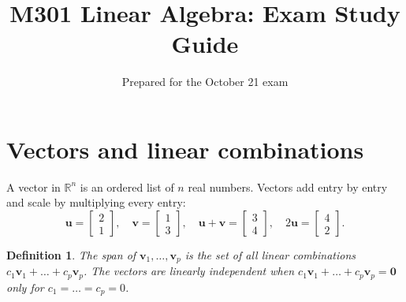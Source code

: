 \documentclass[11pt]{article}
\title{M301 Linear Algebra: Exam Study Guide}
\author{Prepared for the October 21 exam}
\date{}
\newtheorem*{definition}{Definition}
\begin{document}
\maketitle
\tableofcontents

\section{Vectors and linear combinations}

A vector in $\mathbb{R}^n$ is an ordered list of $n$ real numbers. Vectors add
entry by entry and scale by multiplying every entry:
\[
\mathbf{u} = \begin{bmatrix} 2 \\ 1 \end{bmatrix},\quad
\mathbf{v} = \begin{bmatrix} 1 \\ 3 \end{bmatrix},\quad
\mathbf{u} + \mathbf{v} = \begin{bmatrix} 3 \\ 4 \end{bmatrix},\quad
2\mathbf{u} = \begin{bmatrix} 4 \\ 2 \end{bmatrix}.
\]

\begin{center}
\end{center}

\begin{definition}
The \emph{span} of $\mathbf{v}_1,\dots,\mathbf{v}_p$ is the set of all linear
combinations $c_1\mathbf{v}_1 + \dots + c_p\mathbf{v}_p$. The vectors are
\emph{linearly independent} when $c_1\mathbf{v}_1 + \dots + c_p\mathbf{v}_p = \mathbf{0}$
only for $c_1 = \dots = c_p = 0$.
\end{definition}
\end{document}
